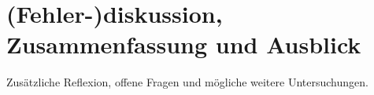 	\section{(Fehler-)diskussion, Zusammenfassung und Ausblick}
	Zusätzliche Reflexion, offene Fragen und mögliche weitere Untersuchungen.
	
